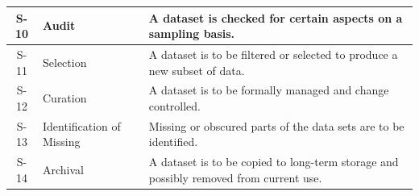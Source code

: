 \begin{longtable}{|C{}|L{}|L{}|}
	\hline
	S-10 & Audit & A dataset is checked for certain aspects on a sampling basis. \\
	\hline
	S-11 & Selection & A dataset is to be filtered or selected to produce a new subset of data.\\
	\hline
	S-12 & Curation & A dataset is to be formally managed and change controlled.\\
	\hline
	S-13 & Identification of Missing & Missing or obscured parts of the data sets are to be identified.\\
	\hline
	S-14 & Archival & A dataset is to be copied to long-term storage and possibly removed from current use.\\
	\hline
\end{longtable}

